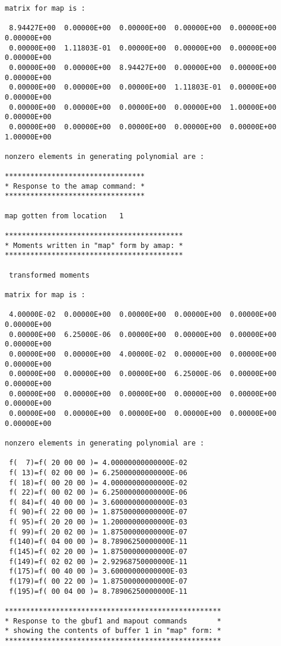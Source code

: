 \begin{footnotesize}
\begin{verbatim}
matrix for map is :

 8.94427E+00  0.00000E+00  0.00000E+00  0.00000E+00  0.00000E+00  0.00000E+00
 0.00000E+00  1.11803E-01  0.00000E+00  0.00000E+00  0.00000E+00  0.00000E+00
 0.00000E+00  0.00000E+00  8.94427E+00  0.00000E+00  0.00000E+00  0.00000E+00
 0.00000E+00  0.00000E+00  0.00000E+00  1.11803E-01  0.00000E+00  0.00000E+00
 0.00000E+00  0.00000E+00  0.00000E+00  0.00000E+00  1.00000E+00  0.00000E+00
 0.00000E+00  0.00000E+00  0.00000E+00  0.00000E+00  0.00000E+00  1.00000E+00

nonzero elements in generating polynomial are :

*********************************
* Response to the amap command: *
*********************************

map gotten from location   1

******************************************
* Moments written in "map" form by amap: *
******************************************

 transformed moments

matrix for map is :

 4.00000E-02  0.00000E+00  0.00000E+00  0.00000E+00  0.00000E+00  0.00000E+00
 0.00000E+00  6.25000E-06  0.00000E+00  0.00000E+00  0.00000E+00  0.00000E+00
 0.00000E+00  0.00000E+00  4.00000E-02  0.00000E+00  0.00000E+00  0.00000E+00
 0.00000E+00  0.00000E+00  0.00000E+00  6.25000E-06  0.00000E+00  0.00000E+00
 0.00000E+00  0.00000E+00  0.00000E+00  0.00000E+00  0.00000E+00  0.00000E+00
 0.00000E+00  0.00000E+00  0.00000E+00  0.00000E+00  0.00000E+00  0.00000E+00

nonzero elements in generating polynomial are :

 f(  7)=f( 20 00 00 )= 4.00000000000000E-02
 f( 13)=f( 02 00 00 )= 6.25000000000000E-06
 f( 18)=f( 00 20 00 )= 4.00000000000000E-02
 f( 22)=f( 00 02 00 )= 6.25000000000000E-06
 f( 84)=f( 40 00 00 )= 3.60000000000000E-03
 f( 90)=f( 22 00 00 )= 1.87500000000000E-07
 f( 95)=f( 20 20 00 )= 1.20000000000000E-03
 f( 99)=f( 20 02 00 )= 1.87500000000000E-07
 f(140)=f( 04 00 00 )= 8.78906250000000E-11
 f(145)=f( 02 20 00 )= 1.87500000000000E-07
 f(149)=f( 02 02 00 )= 2.92968750000000E-11
 f(175)=f( 00 40 00 )= 3.60000000000000E-03
 f(179)=f( 00 22 00 )= 1.87500000000000E-07
 f(195)=f( 00 04 00 )= 8.78906250000000E-11

***************************************************
* Response to the gbuf1 and mapout commands       *
* showing the contents of buffer 1 in "map" form: *
***************************************************


\end{verbatim}
\end{footnotesize}
